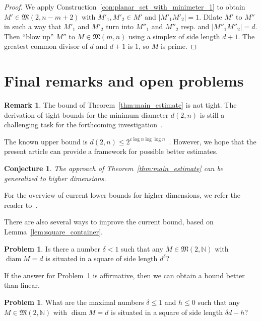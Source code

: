 \documentclass[a4paper,14pt]{article} %
\theoremstyle{plain}
\newtheorem{conjecture}[theorem]{Conjecture}
\theoremstyle{definition}
\newtheorem{remark}[theorem]{Remark}
\newtheorem{problem}[theorem]{Problem}
\begin{document}
\begin{proof}
	We apply Construction~\ref{con:planar_set_with_minimeter_1} to obtain $M'\in \mathfrak{M}(2,n-m+2)$
	with $M'_1, M'_2 \in M'$ and $|M'_1 M'_2| = 1$.
	Dilate $M'$ to $M''$ in such a way that $M'_1$ and $M'_2$ turn into $M''_1$ and $M''_2$ resp.
	and $|M''_1 M''_2| = d$.
	Then ``blow up'' $M''$ to $M\in \mathfrak{M}(m,n)$ using a simplex of side length $d+1$.
	The greatest common divisor of $d$ and $d+1$ is $1$, so $M$ is prime.
\end{proof}


\section{Final remarks and open problems}

\begin{remark}
	The bound of Theorem~\ref{thm:main_estimate} is not tight.
	The derivation of tight bounds for the minimum diameter $d(2, n)$
	is still a challenging task for the forthcoming investigation~\cite[Section 7]{kurz2008minimum}.
\end{remark}
The known upper bound is $d(2,n)\leq 2^{c \log n \log \log n}$~\cite{harborth1993upper}.
However, we hope that the present article can provide a framework for possible better estimates.

\begin{conjecture}
	The approach of Theorem~\ref{thm:main_estimate} can be generalized to higher dimensions.
\end{conjecture}
For the overview of current lower bounds for higher dimensions, we refer the reader to~\cite{nozaki2013lower}.

There are also several ways to improve the current bound,
based on Lemma~\ref{lem:square_container}.

\begin{problem}
	\label{prb:square_side_length_and_diameter_power}
	Is there a number $\delta < 1$ such that any $M\in\mathfrak{M}(2,\mathbb{N})$ with $\operatorname{diam} M = d$
	is situated in a square of side length $d^\delta$?
\end{problem}
If the answer for Problem~\ref{prb:square_side_length_and_diameter_power} is affirmative,
then we can obtain a bound better than linear.

\begin{problem}
	\label{prb:square_side_length_and_diameter_linear}
	What are the maximal numbers $\delta \leq 1$ and $h \leq 0$
	such that any $M\in\mathfrak{M}(2,\mathbb{N})$ with $\operatorname{diam} M = d$
	is situated in a square of side length $\delta d - h$?
\end{problem}
\end{document}
